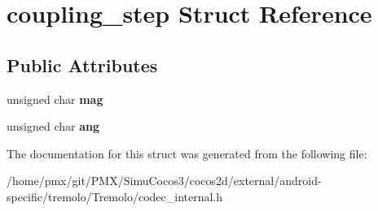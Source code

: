 \hypertarget{structcoupling__step}{}\section{coupling\+\_\+step Struct Reference}
\label{structcoupling__step}
\subsection*{Public Attributes}
\begin{DoxyCompactItemize}
\item 
\mbox{\label{structcoupling__step_a492ed3705a702e3360b5c7df6fa1c21d}} 
unsigned char {\bfseries mag}
\item 
\mbox{\label{structcoupling__step_a6be82baad001a5bfb60501137b5ee2c9}} 
unsigned char {\bfseries ang}
\end{DoxyCompactItemize}


The documentation for this struct was generated from the following file\+:\begin{DoxyCompactItemize}
\item 
/home/pmx/git/\+P\+M\+X/\+Simu\+Cocos3/cocos2d/external/android-\/specific/tremolo/\+Tremolo/codec\+\_\+internal.\+h\end{DoxyCompactItemize}
